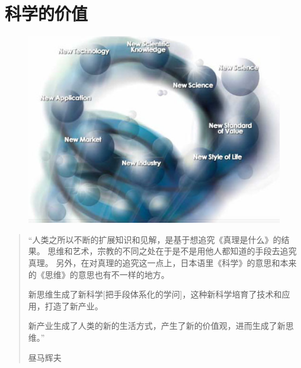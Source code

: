 \chapter*{科学的价值}

\begin{center}
\begin{figure}[h]
\includegraphics[clip,width=\textwidth]{Foreword/science-vision.ps}
\end{figure}
\end{center}

\begin{quote}
``人类之所以不断的扩展知识和见解，是基于想追究《真理是什么》的结果。
思维和艺术，宗教的不同之处在于是不是用他人都知道的手段去追究真理。
另外，在对真理的追究这一点上，日本语里《科学》的意思和本来的《思维》的意思也有不一样的地方。

新思维生成了新科学[把手段体系化的学问]，这种新科学培育了技术和应用，打造了新产业。

新产业生成了人类的新的生活方式，产生了新的价值观，进而生成了新思维。'' 

\qquad 昼马辉夫

\end{quote}



